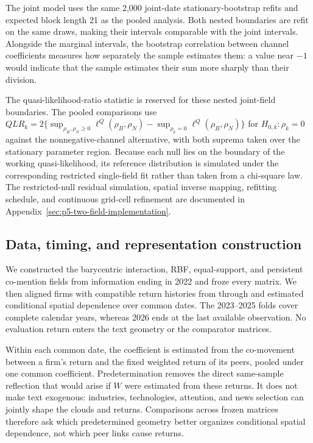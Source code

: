 The joint model uses the same 2,000 joint-date stationary-bootstrap refits and
expected block length 21 as the pooled analysis.
Both nested boundaries are refit on the same draws, making their intervals
comparable with the joint intervals.
Alongside the marginal intervals, the bootstrap correlation between channel
coefficients measures how separately the sample estimates them: a value near
$-1$ would indicate that the sample estimates their sum more sharply than their
division.

The quasi-likelihood-ratio statistic is reserved for these nested joint-field
boundaries.
The pooled comparisons use
$QLR_k=2\{\sup_{\rho_B,\rho_N\geq 0}\ell^Q(\rho_B,\rho_N)
-\sup_{\rho_k=0}\ell^Q(\rho_B,\rho_N)\}$ for $H_{0,k}:\rho_k=0$ against the
nonnegative-channel alternative, with both suprema taken over the stationary
parameter region.
Because each null lies on the boundary of the working quasi-likelihood, its
reference distribution is simulated under the corresponding restricted
single-field fit rather than taken from a chi-square law.
The restricted-null residual simulation, spatial inverse mapping, refitting
schedule, and continuous grid-cell refinement are documented in
Appendix~\ref{sec:p5-two-field-implementation}.

\subsection{Data, timing, and representation construction}
\label{sec:panel-data}

We constructed the barycentric interaction, RBF, equal-support, and persistent
co-mention fields from information ending in 2022 and froze every matrix.
We then aligned firms with compatible return histories from
 through
 and estimated conditional spatial
dependence over
 common dates.
The 2023--2025 folds cover complete calendar years, whereas 2026 ends at the
last available observation.
No evaluation return enters the text geometry or the comparator matrices.

Within each common date, the coefficient is estimated from the co-movement
between a firm's return and the fixed weighted return of its peers, pooled under
one common coefficient.
Predetermination removes the direct same-sample reflection that would arise if
$W$ were estimated from these returns.
It does not make text exogenous: industries, technologies, attention, and news
selection can jointly shape the clouds and returns.
Comparisons across frozen matrices therefore ask which predetermined geometry
better organizes conditional spatial dependence, not which peer links cause
returns.

